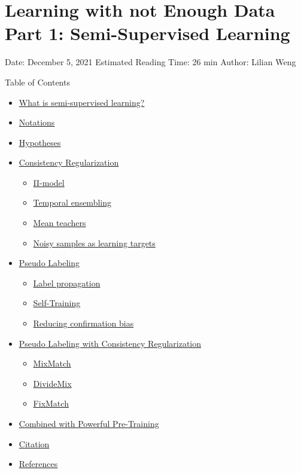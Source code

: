 \section{Learning with not Enough Data Part 1: Semi-Supervised Learning}\label{learning-with-not-enough-data-part-1-semi-supervised-learning}

Date: December 5, 2021 \textbar{} Estimated Reading Time: 26 min \textbar{} Author: Lilian Weng

{Table of Contents}

\begin{itemize}
\tightlist
\item
  \hyperref[what-is-semi-supervised-learning]{What is semi-supervised learning?}
\item
  \hyperref[notations]{Notations}
\item
  \hyperref[hypotheses]{Hypotheses}
\item
  \hyperref[consistency-regularization]{Consistency Regularization}

  \begin{itemize}
  \tightlist
  \item
    \hyperref[ux5cux25cfux5cux2580-model]{Π-model}
  \item
    \hyperref[temporal-ensembling]{Temporal ensembling}
  \item
    \hyperref[mean-teachers]{Mean teachers}
  \item
    \hyperref[noisy-samples-as-learning-targets]{Noisy samples as learning targets}
  \end{itemize}
\item
  \hyperref[pseudo-labeling]{Pseudo Labeling}

  \begin{itemize}
  \tightlist
  \item
    \hyperref[label-propagation]{Label propagation}
  \item
    \hyperref[self-training]{Self-Training}
  \item
    \hyperref[reducing-confirmation-bias]{Reducing confirmation bias}
  \end{itemize}
\item
  \hyperref[pseudo-labeling-with-consistency-regularization]{Pseudo Labeling with Consistency Regularization}

  \begin{itemize}
  \tightlist
  \item
    \hyperref[mixmatch]{MixMatch}
  \item
    \hyperref[dividemix]{DivideMix}
  \item
    \hyperref[fixmatch]{FixMatch}
  \end{itemize}
\item
  \hyperref[combined-with-powerful-pre-training]{Combined with Powerful Pre-Training}
\item
  \hyperref[citation]{Citation}
\item
  \hyperref[references]{References}
\end{itemize}


